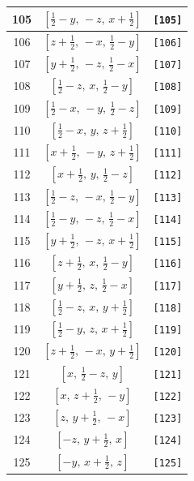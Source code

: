 \documentclass[fleqn,8pt]{jsarticle}
\begin{document}
\begin{longtable}{ccc}
105 & $\left[ \frac{1}{2} - y,\, - z,\, x + \frac{1}{2} \right]$ & {\tt [105]} \\ \hline
106 & $\left[ z + \frac{1}{2},\, - x,\, \frac{1}{2} - y \right]$ & {\tt [106]} \\ \hline
107 & $\left[ y + \frac{1}{2},\, - z,\, \frac{1}{2} - x \right]$ & {\tt [107]} \\ \hline
108 & $\left[ \frac{1}{2} - z,\, x,\, \frac{1}{2} - y \right]$ & {\tt [108]} \\ \hline
109 & $\left[ \frac{1}{2} - x,\, - y,\, \frac{1}{2} - z \right]$ & {\tt [109]} \\ \hline
110 & $\left[ \frac{1}{2} - x,\, y,\, z + \frac{1}{2} \right]$ & {\tt [110]} \\ \hline
111 & $\left[ x + \frac{1}{2},\, - y,\, z + \frac{1}{2} \right]$ & {\tt [111]} \\ \hline
112 & $\left[ x + \frac{1}{2},\, y,\, \frac{1}{2} - z \right]$ & {\tt [112]} \\ \hline
113 & $\left[ \frac{1}{2} - z,\, - x,\, \frac{1}{2} - y \right]$ & {\tt [113]} \\ \hline
114 & $\left[ \frac{1}{2} - y,\, - z,\, \frac{1}{2} - x \right]$ & {\tt [114]} \\ \hline
115 & $\left[ y + \frac{1}{2},\, - z,\, x + \frac{1}{2} \right]$ & {\tt [115]} \\ \hline
116 & $\left[ z + \frac{1}{2},\, x,\, \frac{1}{2} - y \right]$ & {\tt [116]} \\ \hline
117 & $\left[ y + \frac{1}{2},\, z,\, \frac{1}{2} - x \right]$ & {\tt [117]} \\ \hline
118 & $\left[ \frac{1}{2} - z,\, x,\, y + \frac{1}{2} \right]$ & {\tt [118]} \\ \hline
119 & $\left[ \frac{1}{2} - y,\, z,\, x + \frac{1}{2} \right]$ & {\tt [119]} \\ \hline
120 & $\left[ z + \frac{1}{2},\, - x,\, y + \frac{1}{2} \right]$ & {\tt [120]} \\ \hline
121 & $\left[ x,\, \frac{1}{2} - z,\, y \right]$ & {\tt [121]} \\ \hline
122 & $\left[ x,\, z + \frac{1}{2},\, - y \right]$ & {\tt [122]} \\ \hline
123 & $\left[ z,\, y + \frac{1}{2},\, - x \right]$ & {\tt [123]} \\ \hline
124 & $\left[ - z,\, y + \frac{1}{2},\, x \right]$ & {\tt [124]} \\ \hline
125 & $\left[ - y,\, x + \frac{1}{2},\, z \right]$ & {\tt [125]} \\ \hline

\end{longtable}
\end{document}
